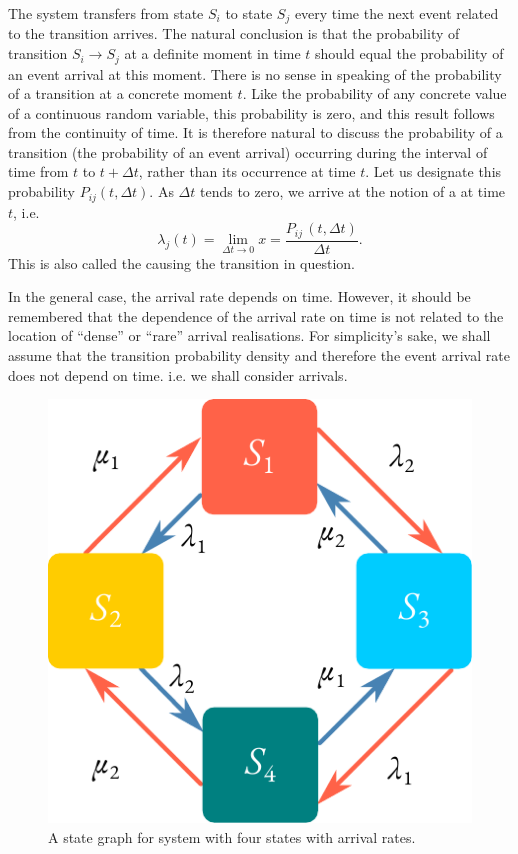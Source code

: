 The system transfers from state $S_{i}$ to state $S_{j}$ every time
the next event related to the transition arrives. The natural
conclusion is that the probability of transition $S_{i} \to S_{j}$ at
a definite moment in time $t$ should equal the probability of an event
arrival at this moment. There is no sense in speaking of the
probability of a transition at a concrete moment $t$. Like the
probability of any concrete value of a continuous random variable,
this probability is zero, and this result follows from the continuity
of time. It is therefore natural to discuss the probability of a
transition (the probability of an event arrival) occurring during the
interval of time from $t$ to $t+ \Delta t$, rather than its occurrence
at time $t$. Let us designate this probability $P_{ij}(t, \Delta
t)$. As $\Delta t$ tends to zero, we arrive at the notion of a
 at time $t$, i.e. 
\begin{equation}%
\lambda_{j} (t) = \lim_{\Delta t \rightarrow 0} x =  \frac{P_{ij}\,(
  t, \Delta t)}{\Delta t}.
\label{eq-2.1}
\end{equation}
This is also called the  causing the transition in
question.

In the general case, the arrival rate depends on time. However, it should
be remembered that the dependence of the arrival rate on time is
not related to the location of ``dense'' or ``rare'' arrival realisations. For
simplicity's sake, we shall assume that the transition probability density
and therefore the event arrival rate does not depend on time. i.e. we
shall consider  arrivals.


 \begin{figure}%
 \centering
 \includegraphics[width=0.9\linewidth]{figures/state-graph2.pdf}
\caption{A state graph for system with four states with arrival rates.
\label{state-graph2}}
 \end{figure}
 

